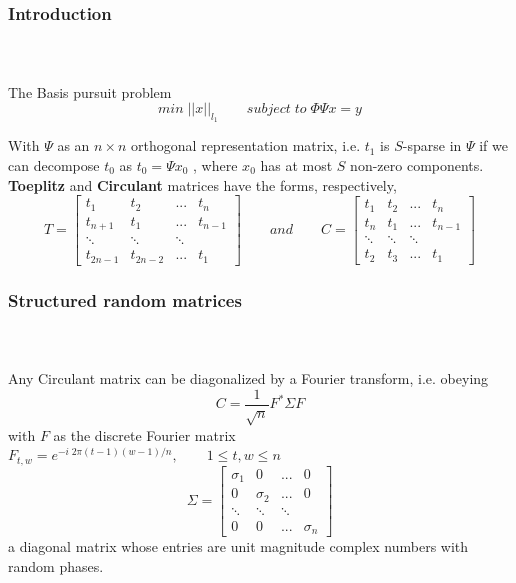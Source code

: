
\begin{frame}[t]
\frametitle{Introduction}
\framesubtitle{~~}  %

The Basis pursuit problem 
\begin{equation}
min  \;||x||_{l_1} \qquad   subject \; to \; \Phi \Psi x=y
\end{equation}

\small
With $\Psi$ as an $n \times n$ orthogonal representation matrix, i.e. $t_{1}$ is $S$-sparse in $\Psi$ if we can decompose $t_0$ as $t_0=\Psi x_0 $ , where $x_0$ has at most $S$ non-zero components.
\\
\normalfont
\textbf{Toeplitz} and \textbf{Circulant} matrices have the forms, respectively,
\\


$$
T = \begin{bmatrix}
	t_{1} & t_{2} & ...& t_{n}           \\[0.3em]
	t_{n+1} & t_{1} & ... & t_{n-1} \\[0.3em]
	\ddots &\ddots & \ddots &    \\[0.3em]
	t_{2n-1} & t_{2n-2}& ... & t_{1}         
\end{bmatrix}
\qquad and \qquad
C = \begin{bmatrix}
t_{1} & t_{2} & ...& t_{n}           \\[0.3em]
t_{n} & t_{1} & ... & t_{n-1} \\[0.3em]
\ddots &\ddots & \ddots &      \\[0.3em]
t_{2} & t_{3}& ... & t_{1}        
\end{bmatrix} 
$$
\end{frame}
\begin{frame}[t]
\frametitle{Structured random matrices}
\framesubtitle{~~}  %
	Any Circulant matrix can be diagonalized by a Fourier transform, i.e. obeying
	$$ C=\frac{1}{\sqrt{n}} F^* \Sigma F $$ with $F$ as the discrete Fourier matrix
	$F_{t,w}=e^{-i\; 2\pi(t-1)(w-1)/n}, \qquad 1 \le t,w \le n$
$$
\Sigma = \begin{bmatrix}
	\sigma_{1} & 0 & ...& 0           \\[0.3em]
	0 & \sigma_{2} & ... & 0 \\[0.3em]
	\ddots &\ddots & \ddots &      \\[0.3em]
	0 & 0 & ... & \sigma_{n}        
\end{bmatrix} $$
a diagonal matrix whose entries are unit magnitude complex numbers with random phases.
\end{frame}


